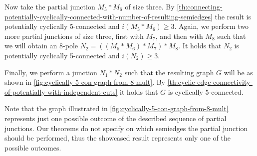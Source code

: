 \documentclass[12pt, twoside]{book}
\begin{document}
\begin{example}
	Now take the partial junction $M_5*M_6$ of size three. By \cref{th:connecting-potentially-cyclically-connected-with-number-of-resulting-semiedges} the result is potentially cyclically \mbox{5-connected} and $i(M_5*M_6)\geq 3$. Again, we perform two more partial junctions of size three, first with $M_7$, and then with $M_8$ such that we will obtain an 8-pole ${N_2=((M_5*M_6)*M_7)*M_8}$. It holds that $N_2$ is potentially cyclically 5-connected and $i(N_2)\geq 3$.
	
	Finally, we perform a junction $N_1*N_2$ such that the resulting graph $G$ will be as shown in \cref{fig:cyclically-5-con-graph-from-8-mult}. By \cref{th:cyclic-edge-connectivity-of-potentially-with-independent-cuts} it holds that $G$ is cyclically 5-connected.
	
	Note that the graph illustrated in \cref{fig:cyclically-5-con-graph-from-8-mult} represents just one possible outcome of the described sequence of partial junctions. Our theorems do not specify on which semiedges the partial junction should be performed, thus the showcased result represents only one of the possible outcomes.
\end{example}
\end{document}
